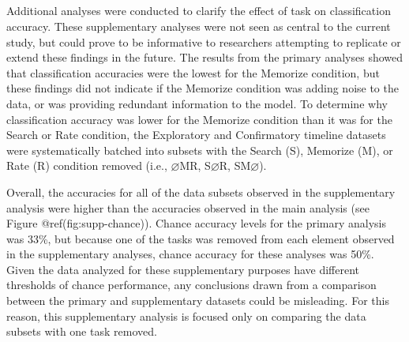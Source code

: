 \clearpage



\begin{appendix}
\section{}
Additional analyses were conducted to clarify the effect of task on
classification accuracy. These supplementary analyses were not seen as
central to the current study, but could prove to be informative to
researchers attempting to replicate or extend these findings in the
future. The results from the primary analyses showed that classification
accuracies were the lowest for the Memorize condition, but these
findings did not indicate if the Memorize condition was adding noise to
the data, or was providing redundant information to the model. To
determine why classification accuracy was lower for the Memorize
condition than it was for the Search or Rate condition, the Exploratory
and Confirmatory timeline datasets were systematically batched into
subsets with the Search (S), Memorize (M), or Rate (R) condition removed
(i.e., \(\varnothing\)MR, S\(\varnothing\)R, SM\(\varnothing\)).

Overall, the accuracies for all of the data subsets observed in the
supplementary analysis were higher than the accuracies observed in the
main analysis (see Figure @ref(fig:supp-chance)). Chance accuracy levels
for the primary analysis was 33\%, but because one of the tasks was
removed from each element observed in the supplementary analyses, chance
accuracy for these analyses was 50\%. Given the data analyzed for these
supplementary purposes have different thresholds of chance performance,
any conclusions drawn from a comparison between the primary and
supplementary datasets could be misleading. For this reason, this
supplementary analysis is focused only on comparing the data subsets
with one task removed.


\end{appendix}
